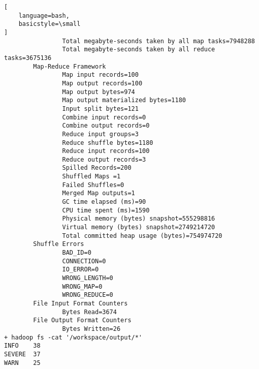 \documentclass[a4paper]{article}
\begin{document}
\begin{lstlisting}[
    language=bash,
    basicstyle=\small
]
                Total megabyte-seconds taken by all map tasks=7948288
                Total megabyte-seconds taken by all reduce tasks=3675136
        Map-Reduce Framework
                Map input records=100
                Map output records=100
                Map output bytes=974
                Map output materialized bytes=1180
                Input split bytes=121
                Combine input records=0
                Combine output records=0
                Reduce input groups=3
                Reduce shuffle bytes=1180
                Reduce input records=100
                Reduce output records=3
                Spilled Records=200
                Shuffled Maps =1
                Failed Shuffles=0
                Merged Map outputs=1
                GC time elapsed (ms)=90
                CPU time spent (ms)=1590
                Physical memory (bytes) snapshot=555298816
                Virtual memory (bytes) snapshot=2749214720
                Total committed heap usage (bytes)=754974720
        Shuffle Errors
                BAD_ID=0
                CONNECTION=0
                IO_ERROR=0
                WRONG_LENGTH=0
                WRONG_MAP=0
                WRONG_REDUCE=0
        File Input Format Counters
                Bytes Read=3674
        File Output Format Counters
                Bytes Written=26
+ hadoop fs -cat '/workspace/output/*'
INFO    38
SEVERE  37
WARN    25
\end{lstlisting}
\end{document}
